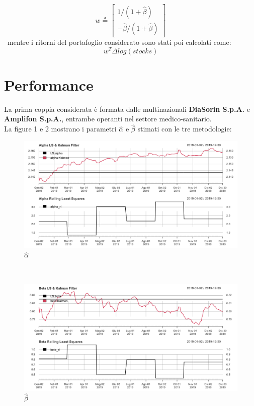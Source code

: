 \documentclass[]{article}
\begin{document}
\begin{equation} 
w\triangleq \begin{bmatrix}
	1/(1 + \hat{\beta}) \\
	-\hat{\beta}/(1 + \hat{\beta})
\end{bmatrix}
\end{equation}
\
mentre i ritorni del portafoglio considerato sono stati poi calcolati come:
\begin{equation}
	w^T\Delta log(stocks)
\end{equation}

\section{Performance}
La prima coppia considerata è formata dalle multinazionali \textbf{DiaSorin S.p.A.} e  \textbf{Amplifon S.p.A.}, entrambe operanti nel settore medico-sanitario.
\\
La figure 1 e 2 mostrano i parametri $\hat{\alpha}$ e $\hat{\beta}$ stimati con le tre metodologie:
\begin{figure}[h]
	\caption{$\hat{\alpha}$}
	\centering
	\includegraphics[scale=0.3]{alpha_dia_amp.png}
\end{figure}
\\
\begin{figure}[h]
	\caption{$\hat{\beta}$}
	\centering
	\includegraphics[scale=0.3]{beta_dia_amp.png}
\end{figure}
\end{document}

